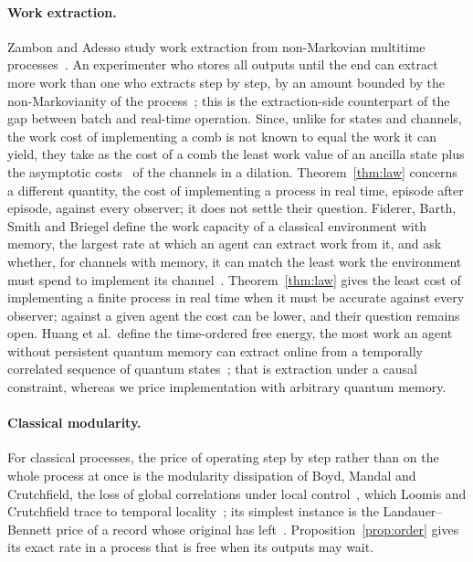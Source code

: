 \documentclass[11pt]{article}
\theoremstyle{definition}
\theoremstyle{remark}
\begin{document}
\paragraph{Work extraction.} Zambon and Adesso study work extraction from non-Markovian multitime processes~\cite{ZambonAdesso}. An experimenter who stores all outputs until the end can extract more work than one who extracts step by step, by an amount bounded by the non-Markovianity of the process~\cite[Thm.~2]{ZambonAdesso}; this is the extraction-side counterpart of the gap between batch and real-time operation. Since, unlike for states and channels, the work cost of implementing a comb is not known to equal the work it can yield, they take as the cost of a comb the least work value of an ancilla state plus the asymptotic costs~\cite{FBB19,FBB21} of the channels in a dilation. Theorem~\ref{thm:law} concerns a different quantity, the cost of implementing a process in real time, episode after episode, against every observer; it does not settle their question. Fiderer, Barth, Smith and Briegel define the work capacity of a classical environment with memory, the largest rate at which an agent can extract work from it, and ask whether, for channels with memory, it can match the least work the environment must spend to implement its channel~\cite{Fiderer26}. Theorem~\ref{thm:law} gives the least cost of implementing a finite process in real time when it must be accurate against every observer; against a given agent the cost can be lower, and their question remains open. Huang et al.\ define the time-ordered free energy, the most work an agent without persistent quantum memory can extract online from a temporally correlated sequence of quantum states~\cite{HuangTOFE}; that is extraction under a causal constraint, whereas we price implementation with arbitrary quantum memory.

\paragraph{Classical modularity.} For classical processes, the price of operating step by step rather than on the whole process at once is the modularity dissipation of Boyd, Mandal and Crutchfield, the loss of global correlations under local control~\cite{BMC18}, which Loomis and Crutchfield trace to temporal locality~\cite{LoomisCrutchfield20}; its simplest instance is the Landauer--Bennett price of a record whose original has left~\cite{Bennett73,Bennett82}. Proposition~\ref{prop:order} gives its exact rate in a process that is free when its outputs may wait.
\end{document}
